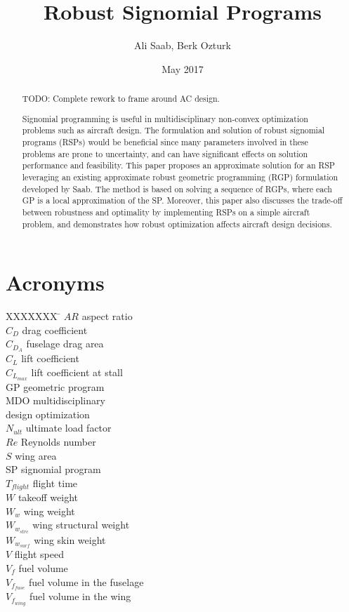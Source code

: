 \documentclass{article}
\title{Robust Signomial Programs}
\author{Ali Saab, Berk Ozturk}
\date{May 2017}
\begin{document}
\maketitle

\begin{abstract}
TODO: Complete rework to frame around AC design. 

Signomial programming is useful in multidisciplinary non-convex optimization problems such as aircraft design. The formulation and solution of robust signomial programs (RSPs) would be beneficial since many parameters involved in these problems are prone to uncertainty, and can have significant effects on solution performance and feasibility. This paper proposes an approximate solution for an RSP leveraging an existing approximate robust geometric programming (RGP) formulation developed by Saab. The method is based on solving a sequence of RGPs, where each GP is a local approximation of the SP. Moreover, this paper also discusses the trade-off between robustness and optimality by implementing RSPs on a simple aircraft problem, and demonstrates how robust optimization affects aircraft design decisions.
\end{abstract}


\section*{Acronyms}
\begin{multicols}{2}
\begin{tabbing}
  XXXXXXX \= \kill%
$AR$ \> aspect ratio \\
$C_D$ \> drag coefficient \\ 
$C_{D_{A}}$ \> fuselage drag area \\ 
$C_L$ \> lift coefficient \\
$C_{L_{max}}$ \> lift coefficient at stall \\
GP \> geometric program \\
MDO \> multidisciplinary \\
    \>design optimization \\
$N_{ult}$ \> ultimate load factor \\
$Re$ \> Reynolds number \\
$S$ \> wing area \\ 
SP \> signomial program \\
$T_{flight}$ \> flight time \\
$W$ \> takeoff weight \\
$W_w$ \> wing weight \\
$W_{w_{strc}}$ \> wing structural weight \\
$W_{w_{surf}}$ \> wing skin weight\\
$V$ \> flight speed \\ 
$V_{f}$ \> fuel volume\\
$V_{f_{fuse}}$ \> fuel volume in the fuselage \\
$V_{f_{wing}}$ \> fuel volume in the wing \\
\end{tabbing}
\end{multicols}
\end{document}
